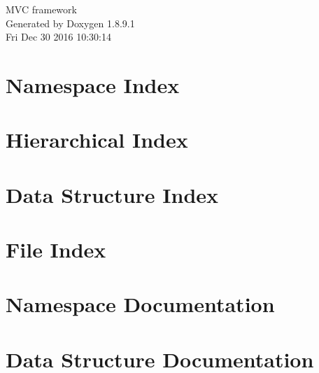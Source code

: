\documentclass[twoside]{book}
\newcommand{\+}{\discretionary{\mbox{\scriptsize$\hookleftarrow$}}{}{}}
\newcommand{\clearemptydoublepage}{%
  \newpage{\pagestyle{empty}\cleardoublepage}%
}
\begin{document}
\hypersetup{pageanchor=false,
             bookmarks=true,
             bookmarksnumbered=true,
             pdfencoding=unicode
            }
\begin{titlepage}
\vspace*{7cm}
\begin{center}%
{\Large M\+V\+C framework }\\
\vspace*{1cm}
{\large Generated by Doxygen 1.8.9.1}\\
\vspace*{0.5cm}
{\small Fri Dec 30 2016 10:30:14}\\
\end{center}
\end{titlepage}
\clearemptydoublepage
\tableofcontents
\clearemptydoublepage
{}
\hypersetup{pageanchor=true}

\chapter{Namespace Index}

\chapter{Hierarchical Index}

\chapter{Data Structure Index}

\chapter{File Index}

\chapter{Namespace Documentation}

\chapter{Data Structure Documentation}
























\end{document}
